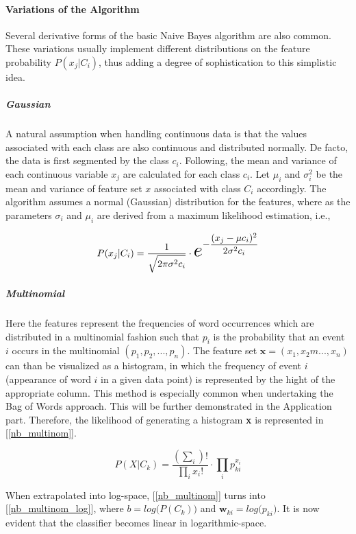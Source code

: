 	\paragraph{Variations of the Algorithm}
		Several derivative forms of the basic Naive Bayes algorithm are also common. These variations usually implement different distributions on the feature probability $ P(x_j|C_i) $, thus adding a degree of sophistication to this simplistic idea.
		
		\subparagraph{Gaussian}
			A natural assumption when handling continuous data is that the values associated with each class are also continuous and distributed normally. De facto, the data is first segmented by the class $ c_i $. Following, the mean and variance of each continuous variable $ x_j $ are calculated for each class  $ c_i $. Let $ \mu_i $ and $ \sigma_i^2 $ be the mean and variance of feature set $ x $ associated with class $ C_i $ accordingly. The algorithm assumes a normal (Gaussian) distribution for the features, where as the parameters $ \sigma_i $ and $ \mu_i $ are derived from a maximum likelihood estimation, i.e.,
	
		\begin{equation}
			P(x_j|C_i) = \frac{1}{\sqrt{\vphantom{\frac{1}{1}} 2 \pi \sigma^2 c_i}} \cdot 
			\scaleobj{2}{e}^{ \displaystyle - \frac{(x_j-\mu c_i)^2}{2 \sigma^2 c_i} }
		\end{equation}
	
		\subparagraph{Multinomial}
			Here the features represent the frequencies of word occurrences which are distributed in a multinomial fashion such that $ p_i $ is the probability that an event $ i $ occurs in the multinomial $ (p_1,p_2, ...,p_n) $. The feature set $ \textbf{x} = (x_1,x_2m ...,x_n) $ can than be visualized as a histogram, in which the frequency of event $ i $ (appearance of word $ i $ in a given data point) is represented by the hight of the appropriate column. This method is especially common when undertaking the Bag of Words approach. This will be further demonstrated in the Application part. Therefore, the likelihood of generating a histogram \textbf{x} is represented in [\ref{nb_multinom}].
	
	\begin{equation}
		P(X|C_k) = \frac{(\sum_i)!}{\prod_i x_i !} \cdot \prod_i p_{ki}^{x_i}
		\label{nb_multinom}
	\end{equation}
	
		When extrapolated into log-space, [\ref{nb_multinom}] turns into [\ref{nb_multinom_log}], where $ b = log \big( P(C_k)\big) $ and $ \textbf{w}_{ki} = log \big( p_{ki} \big) $. It is now evident that the classifier becomes linear in logarithmic-space.
	
